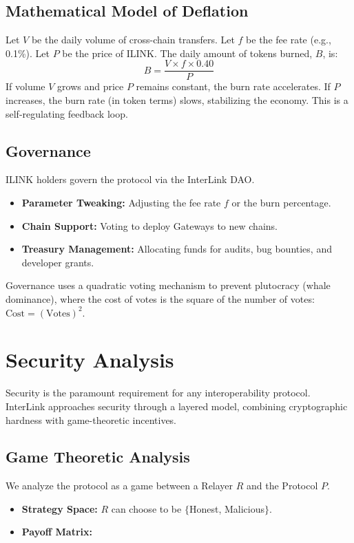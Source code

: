 \documentclass[11pt,a4paper]{article}
\begin{document}
\subsection{Mathematical Model of Deflation}
Let $V$ be the daily volume of cross-chain transfers.
Let $f$ be the fee rate (e.g., 0.1\%).
Let $P$ be the price of ILINK.
The daily amount of tokens burned, $B$, is:
$$ B = \frac{V \times f \times 0.40}{P} $$
If volume $V$ grows and price $P$ remains constant, the burn rate accelerates. If $P$ increases, the burn rate (in token terms) slows, stabilizing the economy. This is a self-regulating feedback loop.

\subsection{Governance}
ILINK holders govern the protocol via the InterLink DAO.
\begin{itemize}
    \item \textbf{Parameter Tweaking:} Adjusting the fee rate $f$ or the burn percentage.
    \item \textbf{Chain Support:} Voting to deploy Gateways to new chains.
    \item \textbf{Treasury Management:} Allocating funds for audits, bug bounties, and developer grants.
\end{itemize}
Governance uses a quadratic voting mechanism to prevent plutocracy (whale dominance), where the cost of votes is the square of the number of votes: $\text{Cost} = (\text{Votes})^2$.

\section{Security Analysis}
\label{sec:security}

Security is the paramount requirement for any interoperability protocol. InterLink approaches security through a layered model, combining cryptographic hardness with game-theoretic incentives.

\subsection{Game Theoretic Analysis}
We analyze the protocol as a game between a Relayer $R$ and the Protocol $P$.
\begin{itemize}
    \item \textbf{Strategy Space:} $R$ can choose to be $\{$Honest, Malicious$\}$.
    \item \textbf{Payoff Matrix:}
\end{itemize}
\end{document}
